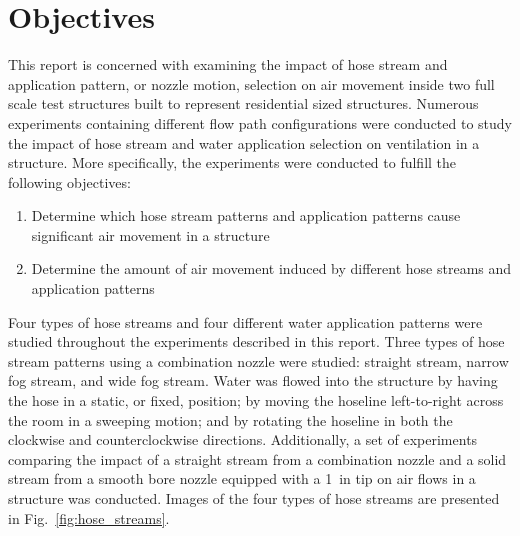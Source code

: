 \documentclass[12pt,oneside]{book}
\begin{document}
\section{Objectives}
\label{sec:objectives}
This report is concerned with examining the impact of hose stream and application pattern, or nozzle motion, selection on air movement inside two full scale test structures built to represent residential sized structures. Numerous experiments containing different flow path configurations were conducted to study the impact of hose stream and water application selection on ventilation in a structure. More specifically, the experiments were conducted to fulfill the following objectives:
\begin{enumerate}
	\item Determine which hose stream patterns and application patterns cause significant air movement in a structure 
	\item Determine the amount of air movement induced by different hose streams and application patterns
	
\end{enumerate}
Four types of hose streams and four different water application patterns were studied throughout the experiments described in this report. Three types of hose stream patterns using a combination nozzle were studied: straight stream, narrow fog stream, and wide fog stream. Water was flowed into the structure by having the hose in a static, or fixed, position; by moving the hoseline left-to-right across the room in a sweeping motion; and by rotating the hoseline in both the clockwise and counterclockwise directions. Additionally, a set of experiments comparing the impact of a straight stream from a combination nozzle and a solid stream from a smooth bore nozzle equipped with a 1~in tip on air flows in a structure was conducted. Images of the four types of hose streams are presented in Fig.~\ref{fig:hose_streams}.
\end{document}
